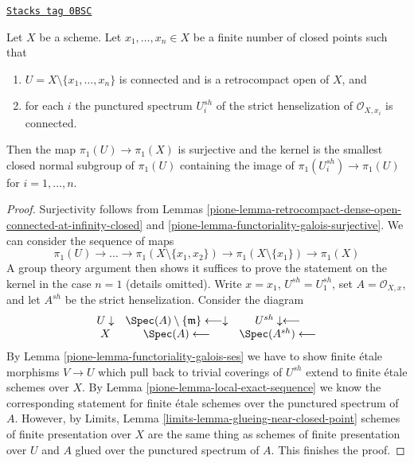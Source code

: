 \begin{lemma}
\label{pione-lemma-exact-sequence-finite-nr-closed-pts}
\href{https://stacks.math.columbia.edu/tag/0BSC}{\texttt{Stacks tag 0BSC}}

Let $X$ be a scheme. Let $x_1, \ldots, x_n \in X$ be a finite
number of closed points such that
\begin{enumerate}
\item $U = X \setminus \{x_1, \ldots, x_n\}$ is connected and is
a retrocompact open of $X$, and
\item for each $i$ the punctured spectrum $U_i^{sh}$ of the
strict henselization of $\mathcal{O}_{X, x_i}$ is connected.
\end{enumerate}
Then the map $\pi_1(U) \to \pi_1(X)$ is surjective and the kernel
is the smallest closed normal subgroup of $\pi_1(U)$ containing
the image of $\pi_1(U_i^{sh}) \to \pi_1(U)$ for $i = 1, \ldots, n$.
\end{lemma}

\begin{proof}

Surjectivity follows from
Lemmas \ref{pione-lemma-retrocompact-dense-open-connected-at-infinity-closed} and
\ref{pione-lemma-functoriality-galois-surjective}.
We can consider the sequence of maps
$$
\pi_1(U)  \to \ldots \to
\pi_1(X \setminus \{x_1, x_2\}) \to \pi_1(X \setminus \{x_1\}) \to \pi_1(X)
$$
A group theory argument then shows it suffices to prove the statement on the
kernel in the case $n = 1$ (details omitted). Write
$x = x_1$, $U^{sh} = U_1^{sh}$,
set $A = \mathcal{O}_{X, x}$, and let $A^{sh}$ be the strict henselization.
Consider the diagram
$$
\begin{array}{ccc}U \downarrow & \Spec(A) \setminus \{\mathfrak m\} \longleftarrow\downarrow & U^{sh} \downarrow\longleftarrow \\ X & \Spec(A) \longleftarrow & \Spec(A^{sh}) \longleftarrow\end{array}
$$
By Lemma \ref{pione-lemma-functoriality-galois-ses}
we have to show finite \'etale morphisms
$V \to U$ which pull back to trivial coverings of $U^{sh}$
extend to finite \'etale schemes over $X$.
By Lemma \ref{pione-lemma-local-exact-sequence}
we know the corresponding statement
for finite \'etale schemes over the punctured spectrum of $A$.
However, by Limits, Lemma \ref{limits-lemma-glueing-near-closed-point}
schemes of finite presentation over $X$ are the same thing as
schemes of finite presentation over $U$ and $A$ glued over
the punctured spectrum of $A$. This finishes the proof.
\end{proof}

